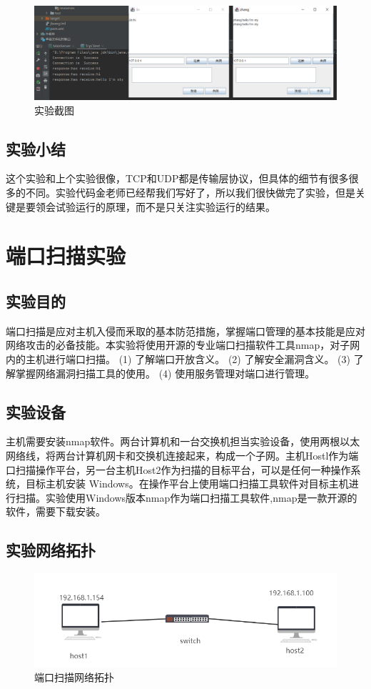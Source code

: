 \documentclass[lang=cn,11pt,a4paper,cite=authoryear]{elegantpaper}
\begin{document}
\begin{figure}[htbp]
	\centering
	\includegraphics[width=0.8\linewidth]{image/screenshot007}
	\caption{实验截图}
	\label{fig:screenshot007}
\end{figure}


\subsection{实验小结}
这个实验和上个实验很像，TCP和UDP都是传输层协议，但具体的细节有很多很多的不同。实验代码金老师已经帮我们写好了，所以我们很快做完了实验，但是关键是要领会试验运行的原理，而不是只关注实验运行的结果。
\section{端口扫描实验}
\subsection{实验目的}
端口扫描是应对主机入侵而釆取的基本防范措施，掌握端口管理的基本技能是应对网络攻击的必备技能。本实验将使用开源的专业端口扫描软件工具nmap，对子网内的主机进行端口扫描。
(1)	了解端口开放含义。
(2)	了解安全漏洞含义。
(3)	了解掌握网络漏洞扫描工具的使用。
(4)	使用服务管理对端口进行管理。

\subsection{实验设备}

主机需要安装nmap软件。两台计算机和一台交换机担当实验设备，使用两根以太网络线，将两台计算机网卡和交换机连接起来，构成一个子网。主机Hostl作为端口扫描操作平台，另一台主机Host2作为扫描的目标平台，可以是任何一种操作系统，目标主机安装 Windows。在操作平台上使用端口扫描工具软件对目标主机进行扫描。实验使用Windows版本nmap作为端口扫描工具软件,nmap是一款开源的软件，需要下载安装。

\subsection{实验网络拓扑}


\begin{figure}[htbp]
	\centering
	\includegraphics[width=0.7\linewidth]{image/screenshot009}
	\caption{端口扫描网络拓扑}
	\label{fig:screenshot009}
\end{figure}
\end{document}

